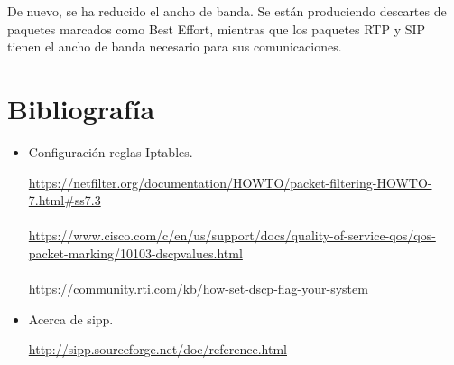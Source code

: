 \documentclass[11pt]{article}
\begin{document}
De nuevo, se ha reducido el ancho de banda. Se están produciendo descartes de paquetes marcados como Best Effort, mientras que los paquetes RTP y SIP tienen el ancho de banda necesario para sus comunicaciones.
\section{Bibliografía}

\begin{itemize}
	\item Configuración reglas Iptables.

	\url{https://netfilter.org/documentation/HOWTO/packet-filtering-HOWTO-7.html#ss7.3}\\ \\
	\url{https://www.cisco.com/c/en/us/support/docs/quality-of-service-qos/qos-packet-marking/10103-dscpvalues.html}\\ \\
	\url{https://community.rti.com/kb/how-set-dscp-flag-your-system}
	
	\item Acerca de sipp.
	
	\url{http://sipp.sourceforge.net/doc/reference.html}
\end{itemize}
\end{document}
